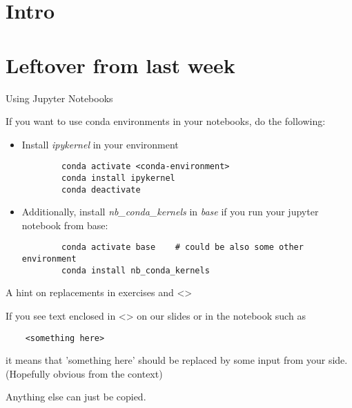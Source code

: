 
\subtitle{Start programming in Python}
\date{2020-04-02}


\begin{frame}
	\tableofcontents
\end{frame}

\section{Intro}


\section{Leftover from last week}

\begin{frame}[fragile]{Using Jupyter Notebooks}
	
	If you want to use conda environments in your notebooks, do the following:
	\begin{itemize}
		\item Install \textit{ipykernel} in your environment
		
		\begin{verbatim}
		conda activate <conda-environment>
		conda install ipykernel
		conda deactivate
		\end{verbatim}
		\item Additionally, install \textit{nb\_conda\_kernels} in \textit{base} if you run your jupyter notebook from base:
		\begin{verbatim}
		conda activate base    # could be also some other environment
		conda install nb_conda_kernels
		\end{verbatim}
	\end{itemize}
\end{frame}

\begin{frame}[fragile]{A hint on replacements in exercises and <>}
	
	If you see text enclosed in <> on our slides or in the notebook such as
	\begin{verbatim}
	<something here>
	\end{verbatim}
	it means that 'something here' should be replaced by some input from your side. (Hopefully obvious from the context)
	
	Anything else can just be copied.

\end{frame}


